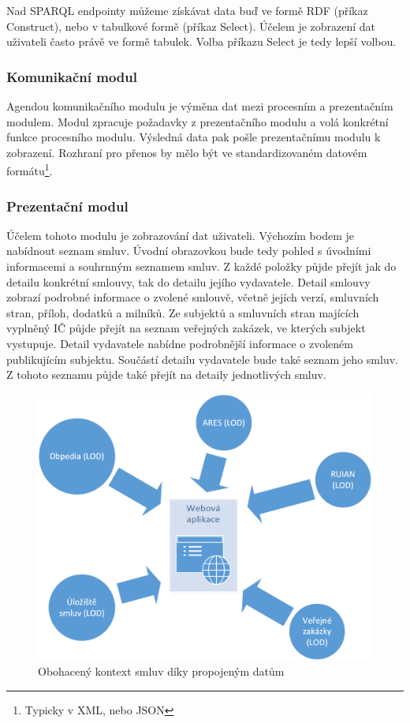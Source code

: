 Nad SPARQL endpointy můžeme získávat data buď ve formě RDF (příkaz Construct), nebo v tabulkové formě (příkaz Select). Účelem je zobrazení dat uživateli často právě ve formě tabulek. Volba příkazu Select je tedy lepší volbou.

\subsubsection*{Komunikační modul}

Agendou komunikačního modulu je výměna dat mezi procesním a prezentačním modulem. Modul zpracuje požadavky z prezentačního modulu a volá konkrétní funkce procesního modulu. Výsledná data pak pošle prezentačnímu modulu k zobrazení. Rozhraní pro přenos by mělo být ve standardizovaném datovém formátu\footnote{Typicky v XML, nebo JSON}.

\subsubsection*{Prezentační modul}

Účelem tohoto modulu je zobrazování dat uživateli. Výchozím bodem je nabídnout seznam smluv. Úvodní obrazovkou bude tedy pohled s úvodními informacemi a souhrnným seznamem smluv. Z každé položky půjde přejít jak do detailu konkrétní smlouvy, tak do detailu jejího vydavatele. Detail smlouvy zobrazí podrobné informace o zvolené smlouvě, včetně jejích verzí, smluvních stran, příloh, dodatků a milníků. Ze subjektů a smluvních stran majících vyplněný IČ půjde přejít na seznam veřejných zakázek, ve kterých subjekt vystupuje. Detail vydavatele nabídne podrobnější informace o zvoleném publikujícím subjektu. Součástí detailu vydavatele bude také seznam jeho smluv. Z tohoto seznamu půjde také přejít na detaily jednotlivých smluv.

\begin{figure}[H]
\centerline{\includegraphics[width=120mm]{img/linkedDataAdv.eps}}
\caption{Obohacený kontext smluv díky propojeným datům}
\label{obr:linkedDataAdv}
\end{figure}